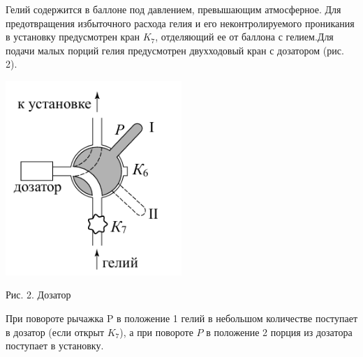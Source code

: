 Гелий содержится в баллоне под давлением, превышающим атмосферное. Для предотвращения избыточного расхода гелия и его неконтролируемого проникания в установку предусмотрен кран $K_7$, отделяющий ее от баллона с гелием.Для подачи малых порций гелия предусмотрен двухходовый кран с дозатором (рис. 2).
\begin{center}
    \includegraphics[width=0.5\textwidth]{img/dozator.png}
    
    Рис. 2. Дозатор
\end{center}
При повороте рычажка P в положение 1 гелий в небольшом количестве поступает в дозатор (если открыт $K_7$), а при повороте $P$ в положение 2 порция из дозатора поступает в установку.


